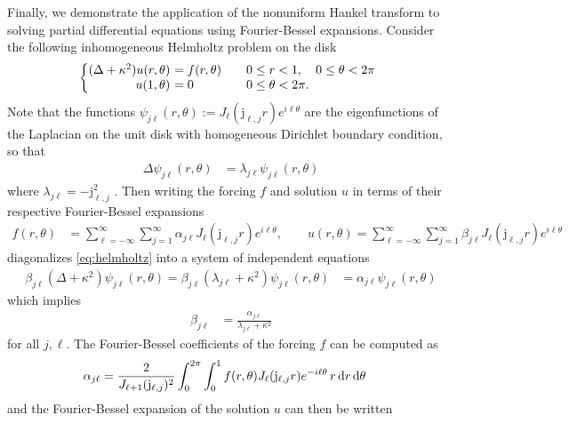 Finally, we demonstrate the application of the nonuniform Hankel transform to
solving partial differential equations using Fourier-Bessel expansions. Consider
the following inhomogeneous Helmholtz problem on the disk
\begin{equation} \label{eq:helmholtz}
  \left\{
    \begin{array}{@{} r@{\ } l@{} l}
      (\Delta + \kappa^2) u(r,\theta) &= f(r,\theta) & \qquad 0 \leq r < 1, \quad 0 \leq \theta < 2\pi \\
      u(1,\theta) &= 0 & \qquad 0 \leq \theta < 2\pi.
    \end{array}
  \right.
\end{equation}
Note that the functions $\psi_{j\ell}(r,\theta) := J_\ell(\mathrm{j}_{\ell,j} r)
e^{i\ell\theta}$ are the eigenfunctions of the Laplacian on the unit disk with
homogeneous Dirichlet boundary condition, so that
\begin{align}
  \Delta \psi_{j\ell}(r,\theta)
  &= \lambda_{j\ell} \psi_{j\ell}(r,\theta)
\end{align}
where $\lambda_{j\ell} = - \mathrm{j}_{\ell,j}^2$ \todocite. Then writing the
forcing $f$ and solution $u$ in terms of their respective Fourier-Bessel
expansions
\begin{align}
  f(r,\theta) 
  &= \sum_{\ell=-\infty}^\infty \sum_{j=1}^\infty \alpha_{j\ell} J_\ell(\mathrm{j}_{\ell,j}r) e^{i\ell\theta}, \qquad
  u(r,\theta) 
  = \sum_{\ell=-\infty}^\infty \sum_{j=1}^\infty \beta_{j\ell} J_\ell(\mathrm{j}_{\ell,j}r) e^{i\ell\theta}
\end{align} 
diagonalizes \eqref{eq:helmholtz} into a system of independent equations 
\begin{align}
  \beta_{j\ell} (\Delta + \kappa^2) \psi_{j\ell}(r, \theta)
  = \beta_{j\ell} (\lambda_{j\ell} + \kappa^2) \psi_{j\ell}(r, \theta)
  &= \alpha_{j\ell} \psi_{j\ell}(r, \theta)
\end{align}
which implies
\begin{align}
  \beta_{j\ell} 
  &= \frac{\alpha_{j\ell}}{\lambda_{j\ell} + \kappa^2}
\end{align}
for all $j, \ell$. The Fourier-Bessel coefficients of the forcing $f$ can be
computed as \todocite
\begin{align} \label{eq:FB-coef}
  \alpha_{j\ell} 
  &= \frac{2}{J_{\ell+1}(\mathrm{j}_{\ell,j})^2} \int_0^{2\pi} \int_0^1 f(r,\theta) J_\ell(\mathrm{j}_{\ell,j}r) e^{-i\ell\theta} \, r \dif{r} \dif{\theta}
\end{align} 
and the Fourier-Bessel expansion of the solution $u$ can then be written
